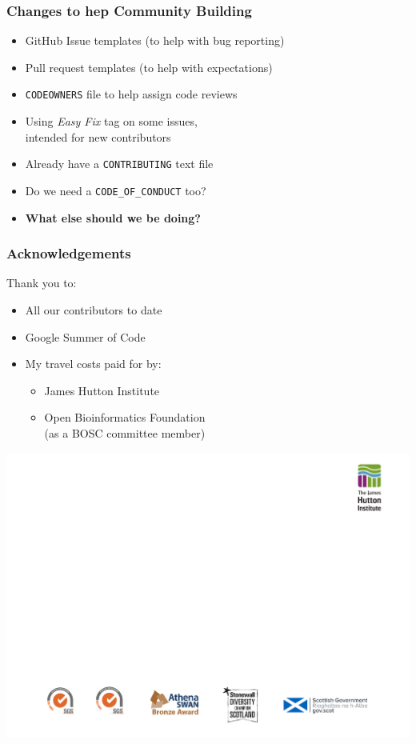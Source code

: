 \begin{frame}
\frametitle{Changes to hep Community Building}
\begin{itemize}
   \item GitHub Issue templates (to help with bug reporting)
   \item Pull request templates (to help with expectations)
   \item \texttt{CODEOWNERS} file to help assign code reviews
   \item Using \textit{Easy Fix} tag on some issues, \\ intended for new contributors
   \item Already have a \texttt{CONTRIBUTING} text file
   \item Do we need a \texttt{CODE\_OF\_CONDUCT} too?
   \item \textbf{What else should we be doing?}
\end{itemize}
\end{frame}


\begin{frame}
\frametitle{Acknowledgements}
Thank you to:
\begin{itemize}
    \item All our contributors to date
    \item Google Summer of Code
    \item My travel costs paid for by:
    \begin{itemize}
       \item James Hutton Institute
       \item Open Bioinformatics Foundation \\
             (as a BOSC committee member)
    \end{itemize}
\end{itemize}

\center\includegraphics[width=0.9\paperwidth]{../images/Hutton-thanks-banner}
\end{frame}


